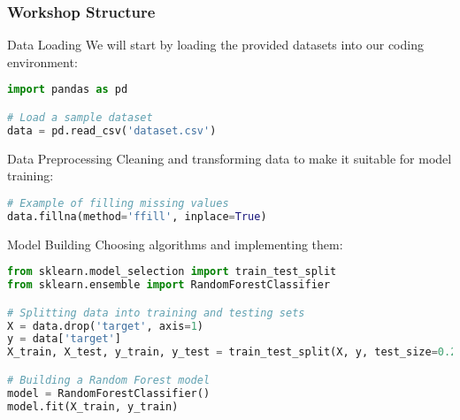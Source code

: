 \documentclass{beamer}
\begin{document}
\begin{frame}[fragile]
    \frametitle{Workshop Structure}
    \begin{block}{Data Loading}
        We will start by loading the provided datasets into our coding environment:
        \begin{lstlisting}[language=Python]
import pandas as pd

# Load a sample dataset
data = pd.read_csv('dataset.csv')
        \end{lstlisting}
    \end{block}
    
    \begin{block}{Data Preprocessing}
        Cleaning and transforming data to make it suitable for model training:
        \begin{lstlisting}[language=Python]
# Example of filling missing values
data.fillna(method='ffill', inplace=True)
        \end{lstlisting}
    \end{block}
    
    \begin{block}{Model Building}
        Choosing algorithms and implementing them:
        \begin{lstlisting}[language=Python]
from sklearn.model_selection import train_test_split
from sklearn.ensemble import RandomForestClassifier

# Splitting data into training and testing sets
X = data.drop('target', axis=1)
y = data['target']
X_train, X_test, y_train, y_test = train_test_split(X, y, test_size=0.2)

# Building a Random Forest model
model = RandomForestClassifier()
model.fit(X_train, y_train)
        \end{lstlisting}
    \end{block}
\end{frame}
\end{document}
